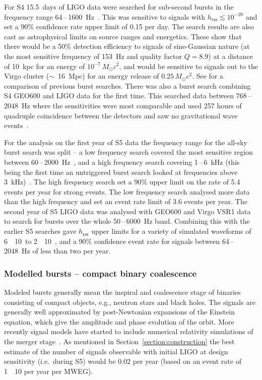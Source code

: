 For S4 15.5~days of LIGO data were searched for sub-second bursts in the
frequency range 64\,--\,1600~Hz~\cite{Abbott:2007b}. This was sensitive to signals
with $h_{\mathrm{rss}}\lesssim10^{-20}$ and set a 90\% confidence rate upper limit of
0.15 per day. The search results are also cast as astrophysical limits on source
ranges and energetics. These show that there would be a 50\% detection
efficiency to signals of sine-Gaussian nature (at the most sensitive frequency
of 153~Hz and quality factor $Q=8.9$) at a distance of 10~kpc for an energy of
$10^{-7}\,M_{\odot}c^2$, and would be sensitive to signals out to the Virgo
cluster ($\sim$~16~Mpc) for an energy release of $0.25\,M_{\odot}c^2$. See
\cite{Abbott:2007b} for a comparison of previous burst searches. There was also
a burst search combining S4 GEO600 and LIGO data for the first time. This
searched data between 768\,--\,2048~Hz where the sensitivities were most comparable
and used 257 hours of quadruple coincidence between the detectors and saw no
gravitational wave events~\cite{Abbott:2008b}.


For the analysis on the first year of S5 data the frequency range for the
all-sky burst search was split -- a low frequency search covered the most
sensitive region between 60\,--\,2000~Hz~\cite{Abbott:2009h}, and a high frequency
search covering 1\,--\,6~kHz (this being the first time an untriggered burst search
looked at frequencies above 3~kHz)~\cite{Abbott:2009i}. The high frequency
search set a 90\% upper limit on the rate of 5.4 events per year for strong
events. The low frequency search analysed more data than the high frequency and
set an event rate limit of 3.6 events per year. The second year of S5 LIGO data
was analysed with GEO600 and Virgo VSR1 data~\cite{Abadie:2010d} to search for
bursts over the whole 50\,--\,6000~Hz band. Combining this with the earlier S5
searches gave $h_{\mathrm{rss}}$ upper limits for a variety of
simulated waveforms of 6~\texttimes~10~\Hz to
2~\texttimes~10~\Hz, and a 90\% confidence event rate for
signals between 64\,--\,2048~Hz of less than two per year.


\subsubsection{Modelled bursts -- compact binary coalescence}
\label{sec:cbc} 

Modeled bursts generally mean the inspiral and coalescence stage of binaries
consisting of compact objects, e.g., neutron stars and black holes. The signals
are generally well approximated by post-Newtonian expansions of the Einstein
equation, which give the amplitude and phase evolution of the orbit. More
recently signal models have started to include numerical relativity simulations
of the merger stage~\cite{Aylott:2009}. As mentioned in
Section~\ref{section:construction} the best estimate of the number of signals
observable with initial LIGO at design sensitivity (i.e.\ during S5) would be
0.02 per year (based on an event rate of 1~\texttimes~10 per year per MWEG).


